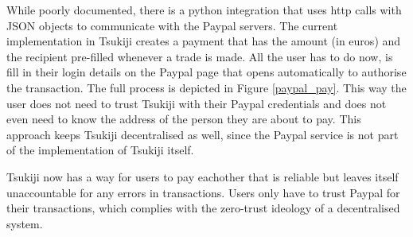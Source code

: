 While poorly documented, there is a python integration that uses http calls with JSON objects to communicate with the Paypal servers.
The current implementation in Tsukiji creates a payment that has the amount (in euros) and the recipient pre-filled whenever a trade is made.
All the user has to do now, is fill in their login details on the Paypal page that opens automatically to authorise the transaction.
The full process is depicted in Figure \ref{paypal_pay}.
This way the user does not need to trust Tsukiji with their Paypal credentials and does not even need to know the address of the person they are about to pay.
This approach keeps Tsukiji decentralised as well, since the Paypal service is not part of the implementation of Tsukiji itself.

Tsukiji now has a way for users to pay eachother that is reliable but leaves itself unaccountable for any errors in transactions.
Users only have to trust Paypal for their transactions, which complies with the zero-trust ideology of a decentralised system.
